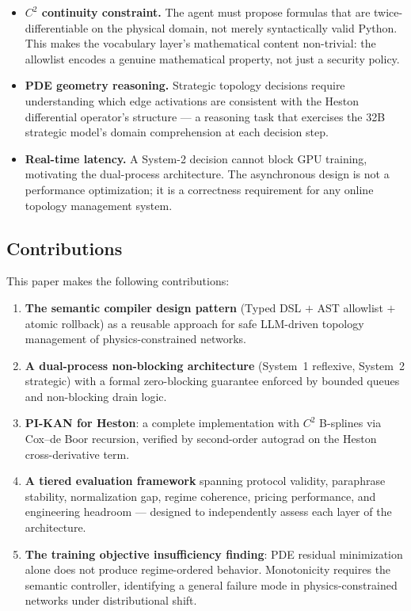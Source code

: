 \documentclass[11pt,a4paper]{article}
\begin{document}
\begin{itemize}[nosep]
  \item \textbf{$C^2$ continuity constraint.} The agent must propose formulas that are
  twice-differentiable on the physical domain, not merely syntactically valid Python.
  This makes the vocabulary layer's mathematical content non-trivial: the allowlist
  encodes a genuine mathematical property, not just a security policy.

  \item \textbf{PDE geometry reasoning.} Strategic topology decisions require
  understanding which edge activations are consistent with the Heston differential
  operator's structure --- a reasoning task that exercises the 32B strategic model's
  domain comprehension at each decision step.

  \item \textbf{Real-time latency.} A System-2 decision cannot block GPU training,
  motivating the dual-process architecture. The asynchronous design is not a
  performance optimization; it is a correctness requirement for any online topology
  management system.
\end{itemize}

\subsection{Contributions}

This paper makes the following contributions:

\begin{enumerate}
  \item \textbf{The semantic compiler design pattern} (Typed DSL $+$ AST allowlist
  $+$ atomic rollback) as a reusable approach for safe LLM-driven topology management
  of physics-constrained networks.

  \item \textbf{A dual-process non-blocking architecture} (System~1 reflexive, System~2
  strategic) with a formal zero-blocking guarantee enforced by bounded queues and
  non-blocking drain logic.

  \item \textbf{PI-KAN for Heston}: a complete implementation with $C^2$ B-splines
  via Cox--de Boor recursion, verified by second-order autograd on the Heston
  cross-derivative term.

  \item \textbf{A tiered evaluation framework} spanning protocol validity, paraphrase
  stability, normalization gap, regime coherence, pricing performance, and engineering
  headroom --- designed to independently assess each layer of the architecture.

  \item \textbf{The training objective insufficiency finding}: PDE residual
  minimization alone does not produce regime-ordered behavior. Monotonicity requires
  the semantic controller, identifying a general failure mode in physics-constrained
  networks under distributional shift.
\end{enumerate}
\end{document}
